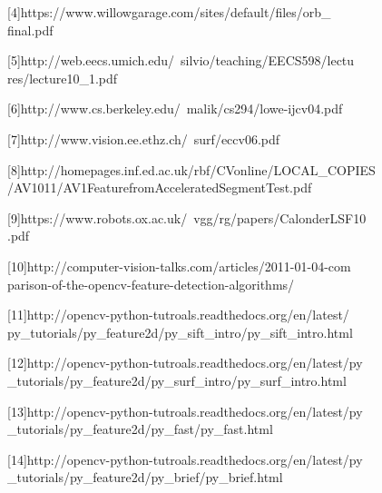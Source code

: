 \documentclass[conference]{IEEEtran}
\begin{document}
[4]https://www.willowgarage.com/sites/default/files/orb\_\\
final.pdf

[5]http://web.eecs.umich.edu/~silvio/teaching/EECS598/lectu\\
res/lecture10\_1.pdf

[6]http://www.cs.berkeley.edu/~malik/cs294/lowe-ijcv04.pdf

[7]http://www.vision.ee.ethz.ch/~surf/eccv06.pdf

[8]http://homepages.inf.ed.ac.uk/rbf/CVonline/LOCAL\_COPIES\\
/AV1011/AV1FeaturefromAcceleratedSegmentTest.pdf

[9]https://www.robots.ox.ac.uk/~vgg/rg/papers/CalonderLSF10\\
.pdf

[10]http://computer-vision-talks.com/articles/2011-01-04-com\\
parison-of-the-opencv-feature-detection-algorithms/

[11]http://opencv-python-tutroals.readthedocs.org/en/latest/\\
py\_tutorials/py\_feature2d/py\_sift\_intro/py\_sift\_intro.html
     
[12]http://opencv-python-tutroals.readthedocs.org/en/latest/py\\
\_tutorials/py\_feature2d/py\_surf\_intro/py\_surf\_intro.html
     
[13]http://opencv-python-tutroals.readthedocs.org/en/latest/py\\
\_tutorials/py\_feature2d/py\_fast/py\_fast.html

[14]http://opencv-python-tutroals.readthedocs.org/en/latest/py\\
\_tutorials/py\_feature2d/py\_brief/py\_brief.html
\end{document}
